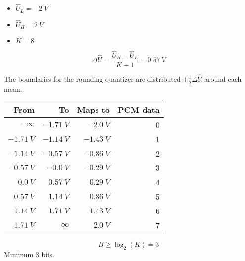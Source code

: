 \begin{solution}
	\begin{tasks}
		\task
		\begin{itemize}
			\item $\hat{U}_L = \SI{-2}{V}$
			\item $\hat{U}_H = \SI{2}{V}$
			\item $K = 8$
		\end{itemize}
		\begin{equation*}
			\Delta \hat{U} = \frac{\hat{U}_H - \hat{U}_L}{K - 1} = \SI{0.57}{V}
		\end{equation*}
		
		The boundaries for the rounding quantizer are distributed $\pm \frac{1}{2} \Delta \hat{U}$ around each mean.
		\begin{table}[H]
			\begin{tabular}{|r|r|r|r|}
				\hline
				From & To & Maps to & PCM data \\
				\hline
				\hline
				$-\infty$ & $\SI{-1.71}{V}$ & $\SI{-2.0}{V}$ & 0
\\
				$\SI{-1.71}{V}$ & $\SI{-1.14}{V}$ & $\SI{-1.43}{V}$ & 1
\\
				$\SI{-1.14}{V}$ & $\SI{-0.57}{V}$ & $\SI{-0.86}{V}$ & 2
\\
				$\SI{-0.57}{V}$ & $\SI{-0.0}{V}$ & $\SI{-0.29}{V}$ & 3
\\
				$\SI{0.0}{V}$ & $\SI{0.57}{V}$ & $\SI{0.29}{V}$ & 4
\\
				$\SI{0.57}{V}$ & $\SI{1.14}{V}$ & $\SI{0.86}{V}$ & 5
\\
				$\SI{1.14}{V}$ & $\SI{1.71}{V}$ & $\SI{1.43}{V}$ & 6
\\
				$\SI{1.71}{V}$ & $\infty$ & $\SI{2.0}{V}$ & 7 \\
				\hline
			\end{tabular}
		\end{table}
	
		\task
		\begin{equation*}
			B \geq \log_2 \left(K\right) = 3
		\end{equation*}
		Minimum 3 bits.
		

\end{tasks}
\end{solution}
